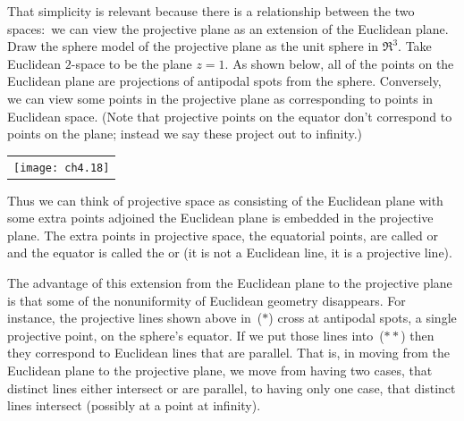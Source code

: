 That simplicity is relevant because there is a 
relationship between the two spaces:~we can view the 
projective plane as an extension of the Euclidean plane.
Draw the sphere model of the projective plane as the unit sphere in $\Re^3$.
Take Euclidean $2$-space to be the plane $z=1$.
As shown below, all of the points on the Euclidean plane are projections of  
antipodal spots from the sphere.
Conversely, we can view some points
in the projective plane as corresponding to points in Euclidean space.
(Note that projective points on the equator don't correspond to points on
the plane; instead we say these project out to infinity.)
\begin{center}
 \hfill
  \begin{tabular}{@{}c@{}}\texttt{[image: ch4.18]}\end{tabular}
 \hfill\llap{($**$)}
\end{center}
Thus we can think of projective space as consisting of the Euclidean plane 
with some extra points adjoined \Dash  
the Euclidean plane is embedded in the projective plane.
The extra points in projective space, the equatorial points,
are called %
or 
and the equator is called the 
%
 or 
(it is not a Euclidean line, it is a projective line). 

The advantage of this extension from the Euclidean plane 
to the projective plane
is that some of the nonuniformity 
of Euclidean geometry disappears.
For instance, the projective lines shown above in~($*$) cross
at antipodal spots, a single projective point, on the sphere's equator.
If we put those lines into~($**$) then they correspond to Euclidean lines that
are parallel.
That is, in moving from the Euclidean plane to the projective plane, we move
from having two cases, 
that distinct lines either intersect or are parallel, to having only
one case, that distinct lines intersect (possibly at a point at infinity). 

